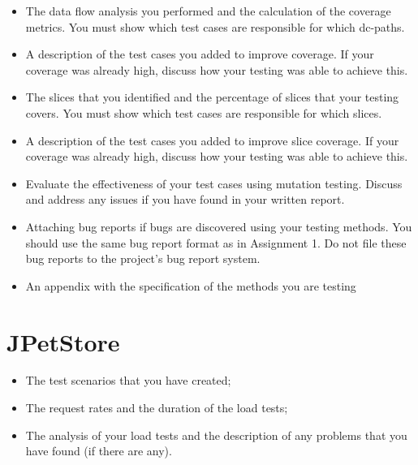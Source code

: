 \documentclass[fontsize=12pt,paper=letter,twoside]{scrartcl}
\begin{document}
 




 

 

 










\begin{itemize}
\item The data flow analysis you performed and the calculation of the coverage metrics. You must
show which test cases are responsible for which dc-paths.
\item A description of the test cases you added to improve coverage. If your coverage was already high,
discuss how your testing was able to achieve this.
\item The slices that you identified and the percentage of slices that your testing covers. You must
show which test cases are responsible for which slices.
\item A description of the test cases you added to improve slice coverage. If your coverage was
already high, discuss how your testing was able to achieve this.
\item Evaluate the effectiveness of your test cases using mutation testing. Discuss and address any
issues if you have found in your written report.
\item Attaching bug reports if bugs are discovered using your testing methods. You should use the
same bug report format as in Assignment 1. Do not file these bug reports to the project’s bug
report system.
\item An appendix with the specification of the methods you are testing
\end{itemize}

\section{JPetStore}

\begin{itemize}
\item The test scenarios that you have created;
\item The request rates and the duration of the load tests;
\item The analysis of your load tests and the description of any problems that you have found (if there
are any).
\end{itemize}
\end{document}
